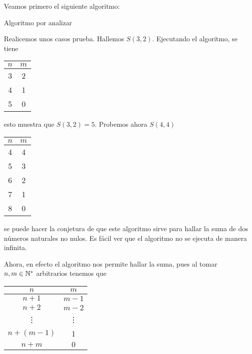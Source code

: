 \begin{ejem}
    Veamos primero el siguiente algoritmo:
    
    \begin{algoritmo}[hbt!]
    \caption{Algoritmo por analizar}\label{alg:poranalizar}
    \end{algoritmo}
    
    Realicemos unos casos prueba. Hallemos $S(3,2)$. Ejecutando el algoritmo, se tiene
    
    \begin{center}
        \begin{tabular}{c|c}
            $n$ & $m$ \\ \toprule
            3   & 2   \\
            4   & 1   \\
            5   & 0
        \end{tabular}
    \end{center}
    
    \noindent esto muestra que $S(3,2) = 5$. Probemos ahora $S(4,4)$
    
    \begin{center}
        \begin{tabular}{c|c}
            $n$ & $m$ \\ \toprule
            4   &  4  \\
            5   &  3  \\
            6   &  2  \\
            7   &  1  \\
            8   &  0
        \end{tabular}
    \end{center}
    
    \noindent se puede hacer la conjetura de que este algoritmo sirve para hallar la suma de dos números naturales no nulos. Es fácil ver que el algoritmo no se ejecuta de manera infinita.
    
    Ahora, en efecto el algoritmo nos permite hallar la suma, pues al tomar $n, m \in \mathbb{N}^*$ arbitrarios tenemos que
    
    \begin{center}
        \begin{tabular}{c|c}
            $n$    &  $m$   \\ \toprule
            $n+1$  &  $m-1$ \\
            $n+2$  &  $m-2$ \\
            \vdots & \vdots \\
            $n + (m-1)$ & 1 \\
            $n+m$  &  $0$
        \end{tabular}
    \end{center}
\end{ejem}

